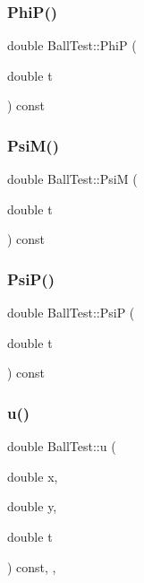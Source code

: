 \mbox{\label{classBallTest_a998742333900f49563e8423abb88cd50}} 
\subsubsection{\texorpdfstring{Phi\+P()}{PhiP()}}
{\footnotesize\ttfamily double Ball\+Test\+::\+PhiP (\begin{DoxyParamCaption}\item[{double}]{t }\end{DoxyParamCaption}) const\hspace{0.3cm}{\ttfamily [inline]}}

\mbox{\label{classBallTest_a4ffad249b636e80473fcc0bec99d1ca6}} 
\subsubsection{\texorpdfstring{Psi\+M()}{PsiM()}}
{\footnotesize\ttfamily double Ball\+Test\+::\+PsiM (\begin{DoxyParamCaption}\item[{double}]{t }\end{DoxyParamCaption}) const\hspace{0.3cm}{\ttfamily [inline]}}

\mbox{\label{classBallTest_ac652d725b7db4c4de6a074ef4b973b6f}} 
\subsubsection{\texorpdfstring{Psi\+P()}{PsiP()}}
{\footnotesize\ttfamily double Ball\+Test\+::\+PsiP (\begin{DoxyParamCaption}\item[{double}]{t }\end{DoxyParamCaption}) const\hspace{0.3cm}{\ttfamily [inline]}}

\mbox{\label{classBallTest_ad2fab0cdc8849ddaf466225e33c0721f}} 
\subsubsection{\texorpdfstring{u()}{u()}}
{\footnotesize\ttfamily double Ball\+Test\+::u (\begin{DoxyParamCaption}\item[{double}]{x,  }\item[{double}]{y,  }\item[{double}]{t }\end{DoxyParamCaption}) const\hspace{0.3cm}{\ttfamily [inline]}, {\ttfamily [override]}, {\ttfamily [virtual]}}



